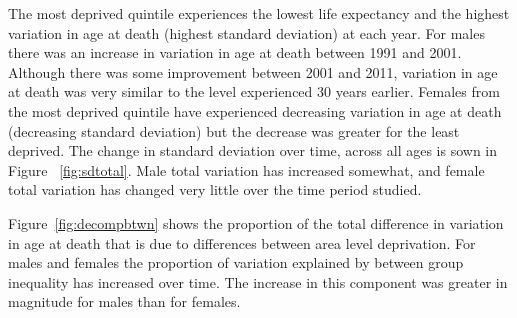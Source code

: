 \documentclass[12pt,oneside,a4paper]{article} %
\theoremstyle{definition}
\begin{document}
The most deprived quintile experiences the lowest life expectancy and
the highest variation in age at death (highest standard deviation) at each year. For males there was an
increase in variation in age at death between 1991 and 2001. Although there was
some improvement between 2001 and 2011, variation in age at death was very
similar to the level experienced 30 years earlier. Females from the most
deprived quintile have experienced decreasing variation in age at death (decreasing standard deviation) but the
decrease was greater for the least deprived. The change in standard
deviation over time, across all ages is sown in Figure ~\ref{fig:sdtotal}. Male
total variation has increased somewhat, and female total variation has changed
very little over the time period studied.

Figure~\ref{fig:decompbtwn} shows the proportion of the total difference in
variation in age at death that is due to differences between area level deprivation. For males and females the proportion of variation explained by between group inequality has increased over time. The increase in this component was greater in magnitude for males than for females.
\end{document}
